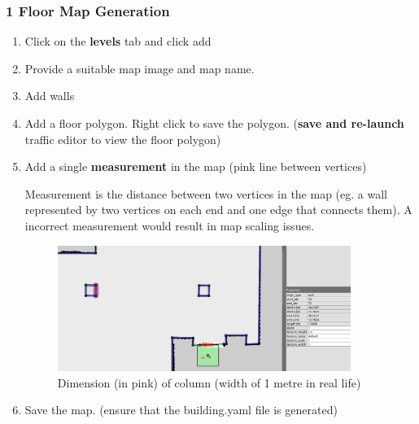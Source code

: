 \documentclass[11pt]{article}
\begin{document}
\subsubsection{1 Floor Map Generation}
\begin{enumerate}
 \item {Click on the \textbf{levels} tab and click add}
 \item {Provide a suitable map image and map name.}
 \item {Add walls}
 \item {Add a floor polygon. Right click to save the polygon. (\textbf{save and re-launch} traffic editor to view the floor polygon)}
 \item {
       Add a single \textbf{measurement} in the map (pink line between vertices)

       Measurement is the distance between two vertices in the map (eg. a wall represented by two vertices on each end and one edge that connects them). A incorrect measurement would result in map scaling issues.

       \begin{figure}[H]
        \centering
        \includegraphics[width=0.9\textwidth]{images/dimension}
        \caption{Dimension (in pink) of column (width of 1 metre in real life)}
       \end{figure}
       }
 \item {Save the map. (ensure that the building.yaml file is generated)}
\end{enumerate}
\end{document}
